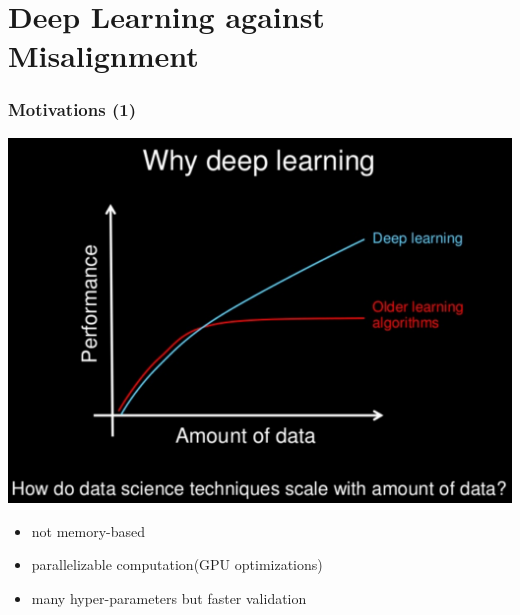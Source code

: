 \section{Deep Learning against Misalignment}
\begin{frame}
\frametitle{Motivations (1)}
\includegraphics[width=.5\textwidth]{figures/whydeeplearning.png} 
\begin{itemize}
\item not memory-based
\item parallelizable computation(GPU optimizations)
\item many hyper-parameters but faster validation
\end{itemize}

\end{frame}

